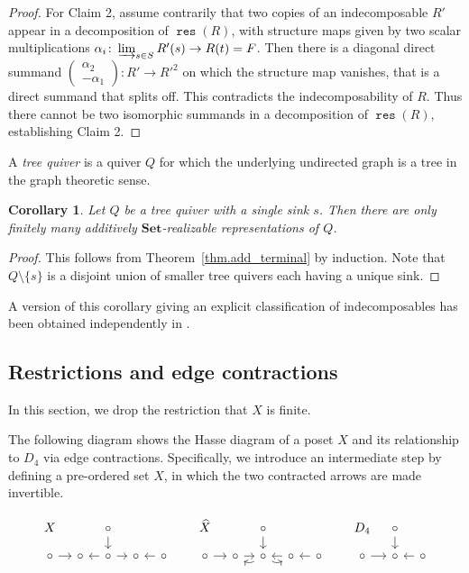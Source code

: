 \documentclass[a4paper]{amsart}
\theoremstyle{plain}
\newtheorem{corollary}[theorem]{Corollary}
\theoremstyle{definition}
\theoremstyle{remark}
\newcommand{\funct}[1]{\operatorname{\mathtt{#1}}}
\newcommand{\Set}{\mathbf{Set}}
\begin{document}
\begin{proof}
For Claim 2, assume contrarily that two copies of an indecomposable \( R' \) appear in a decomposition of \( \funct{res}(R) \), with structure maps given by two scalar multiplications \( \alpha_i \colon \varinjlim_{s \in S} R'(s) \to R(t) = F \). Then there is a diagonal direct summand \( \left( \begin{smallmatrix} \alpha_2 \\ - \alpha_1 \end{smallmatrix} \right) \colon R' \to {R'}^2 \) on which the structure map vanishes, that is a direct summand that splits off. This contradicts the indecomposability of \( R \). Thus there cannot be two isomorphic summands in a decomposition of \( \funct{res}(R) \), establishing Claim 2.
\end{proof}

A \emph{tree quiver} is a quiver $Q$ for which the underlying undirected graph is a tree in the graph theoretic sense. 
\begin{corollary}
\label{cor.treequiver}
Let \( Q \) be a tree quiver with a single sink $s$. Then there are only finitely many additively \( \Set \)-realizable representations of \( Q \).
\end{corollary}

\begin{proof}
This follows from Theorem~\ref{thm.add_terminal} by induction. Note that \( Q \setminus \{ s \} \) is a disjoint union of smaller tree quivers each having a unique sink.
\end{proof}

A version of this corollary giving an explicit classification of indecomposables has been obtained independently in \cite{bindua2024decomposing}.


\subsection{Restrictions and edge contractions}
\label{sec.edge_contractions} In this section, we drop the restriction that $X$ is finite.

The following diagram shows the Hasse diagram of a poset \(X\) and its relationship to \(D_4\) via edge contractions. Specifically, we introduce an intermediate step by defining a pre-ordered set \(\widehat{X}\), in which the two contracted arrows are made invertible.  

\[ \begin{tikzcd}[sep=3mm]
X&& \circ\ar[d] &&&&\widehat{X}&& \circ \ar[d] && && D_4 & \circ\ar[d] &  \\
\circ \ar[r] & \circ & \circ \ar[l] \ar[r] & \circ & \circ \ar[l] && \circ \ar[r] & \circ\ar[r] & \circ \ar[l, bend left]\ar[r, bend right] & \circ \ar[l] & \circ \ar[l] & & \circ \ar[r] & \circ & \ar[l] \circ
\end{tikzcd} \]
\end{document}
